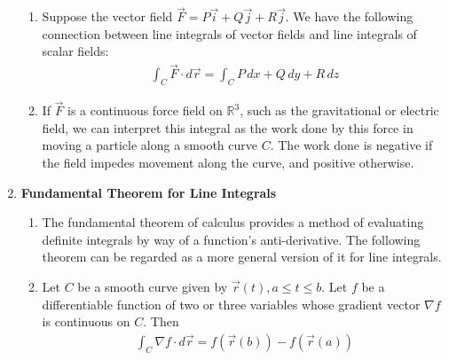 \documentclass[10pt]{article}
\begin{document}
\begin{multicols*}{2}
\begin{enumerate}
\begin{enumerate}
        \item Suppose the vector field $\vec{F}=P\vec{i}+Q\vec{j}+R\vec{j}$. We have the following connection between line integrals of vector fields and line integrals of scalar fields:
        \begin{align*}
            \int_C \vec{F} \cdot d\vec{r} = \int_C P \,dx + Q \,dy + R \,dz
        \end{align*}
        \item If $\vec{F}$ is a continuous force field on $\mathbb{R}^3$, such as the gravitational or electric field, we can interpret this integral as the work done by this force in moving a particle along a smooth curve $C$. The work done is negative if the field impedes movement along the curve, and positive otherwise.
    \end{enumerate}
    
    \item \textbf{Fundamental Theorem for Line Integrals}
    \begin{enumerate}
        \item The fundamental theorem of calculus provides a method of evaluating definite integrals by way of a function's anti-derivative. The following theorem can be regarded as a more general version of it for line integrals.
        \item Let $C$ be a smooth curve given by $\vec{r}(t), a \leq t \leq b$. Let $f$ be a differentiable function of two or three variables whose gradient vector $\nabla f$ is continuous on $C$. Then
        \begin{align*}
            \int_C \nabla f \cdot d\vec{r} = f(\vec{r}(b)) - f(\vec{r}(a))
        \end{align*}


\end{enumerate}
\end{enumerate}
\end{multicols*}
\end{document}
